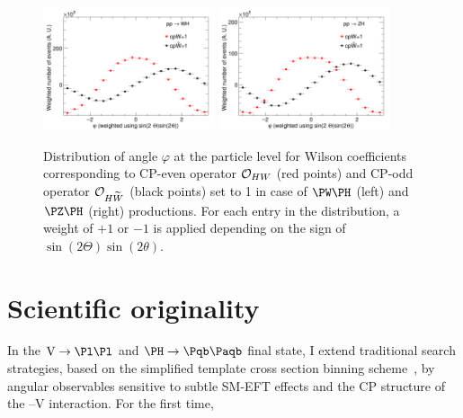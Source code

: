 \documentclass[a4paper,11pt]{article}
\newcommand{\Pb}{{{\Pqb}}\xspace}
\newcommand{\PAb}{{{{\Paqb}}}\xspace}
\renewcommand{\PV}{{{{V}}}\xspace}
\begin{document}
\begin{figure}[tph]
\begin{center}
\includegraphics[width=0.45\textwidth]{Figures/New/LHE/LHE_Plot_phi_WH.png}
\includegraphics[width=0.45\textwidth]{Figures/New/LHE/LHE_Plot_phi_ZH.png}
\end{center}
\caption{
Distribution of angle $\varphi$ at the particle level for Wilson coefficients corresponding to CP-even operator ${\cal O}_{HW}$  (red points) and CP-odd operator ${\cal O}_{H\widetilde{W}}$ (black points) set to 1 in case of $\PW\PH$ (left) and $\PZ\PH$ (right) productions.
For each entry in the distribution, a weight of $+1$ or $-1$ is applied depending on the sign of $\sin\left(2\Theta\right) \sin\left(2\theta\right)$. 
}
\label{fig:LHE_phi}
\end{figure}



\section{Scientific originality}

In the $\textrm{\PV}\rightarrow\Pl\Pl$ and $\PH\rightarrow\Pb\PAb$ final state, I extend traditional search strategies, based on the simplified template cross section binning scheme~\cite{Berger:2019wnu}, by angular observables sensitive to subtle SM-EFT effects and the CP structure of the \PH--\PV interaction. For the first time,
\end{document}
